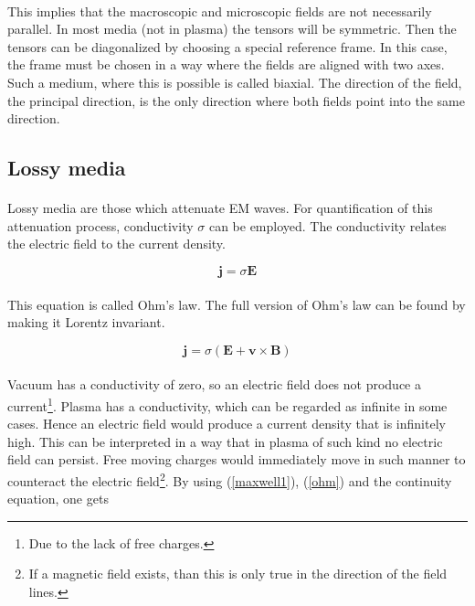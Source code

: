 \documentclass[a4paper,10pt]{thesis}
\begin{document}
\paragraph*{}
This implies that the macroscopic and microscopic fields are not necessarily parallel. In most media (not in plasma) the tensors will be symmetric. Then the tensors can be diagonalized by choosing a special reference frame. In this case, the frame must be chosen in a way where the fields are aligned with two axes. Such a medium, where this is possible is called biaxial. The direction of the field, the principal direction, is the only direction where both fields point into the same direction.

\subsection{Lossy media}
\paragraph*{}
Lossy media are those which attenuate EM waves. For quantification of this attenuation process, conductivity $\sigma$ can be employed. The conductivity relates the electric field to the current density.

\begin{equation}\label{ohm}
    \mathbf{j}=\sigma \mathbf{E}
\end{equation}

\paragraph*{}
This equation is called Ohm's law. The full version of Ohm's law can be found by making it Lorentz invariant.

\begin{equation}\label{ohm_lorenz}
    \mathbf{j}=\sigma (\mathbf{E}+\mathbf{v} \times \mathbf{B})
\end{equation}

\paragraph*{}
Vacuum has a conductivity of zero, so an electric field does not produce a current\footnote{Due to the lack of free charges.}. Plasma has a conductivity, which can be regarded as infinite in some cases. Hence an electric field would produce a current density that is infinitely high. This can be interpreted in a way that in plasma of such kind no electric field can persist. Free moving charges would immediately move in such manner to counteract the electric field\footnote{If a magnetic field exists, than this is only true in the direction of the field lines.}. By using (\ref{maxwell1}), (\ref{ohm}) and the continuity equation, one gets
\end{document}
